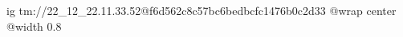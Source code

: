  
 
 
 
 

\qqSecOrig


\ifcmt
  ig tm://22_12_22.11.33.52@f6d562c8c57bc6bedbcfc1476b0c2d33
  @wrap center
  @width 0.8
\fi

